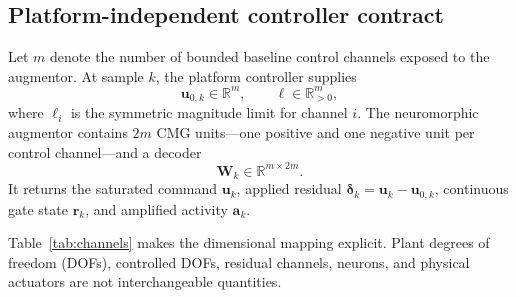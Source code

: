 \documentclass[10pt,twocolumn]{article}
\newcommand{\R}{\mathbb{R}}
\begin{document}
\subsection{Platform-independent controller contract}

Let $m$ denote the number of bounded baseline control channels exposed to the
augmentor. At sample $k$, the platform controller supplies
\begin{equation}
    \bm u_{0,k}\in\R^m, \qquad
    \bm \ell\in\R_{>0}^m,
\end{equation}
where $\ell_i$ is the symmetric magnitude limit for channel $i$. The
neuromorphic augmentor contains $2m$ CMG units---one positive and one
negative unit per control channel---and a decoder
\begin{equation}
    \bm W_k\in\R^{m\times 2m}.
\end{equation}
It returns the saturated command $\bm u_k$, applied residual
$\bm\delta_k=\bm u_k-\bm u_{0,k}$, continuous gate state $\bm r_k$, and
amplified activity $\bm a_k$.

Table~\ref{tab:channels} makes the dimensional mapping explicit. Plant degrees
of freedom (DOFs), controlled DOFs, residual channels, neurons, and physical
actuators are not interchangeable quantities.
\end{document}
